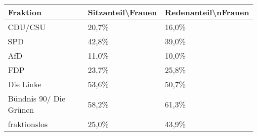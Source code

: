 
\begin{tabular}{lll}
\toprule
Fraktion & Sitzanteil\textbackslash{}Frauen & Redenanteil\textbackslash{}nFrauen\\
\midrule
CDU/CSU & 20,7\% & 16,0\%\\
SPD & 42,8\% & 39,0\%\\
AfD & 11,0\% & 10,0\%\\
FDP & 23,7\% & 25,8\%\\
Die Linke & 53,6\% & 50,7\%\\
Bündnis 90/ Die Grünen & 58,2\% & 61,3\%\\
fraktionslos & 25,0\% & 43,9\%\\
\bottomrule
\end{tabular}